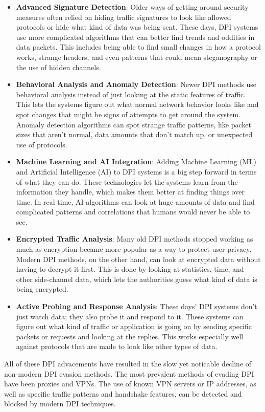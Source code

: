 \documentclass[12pt, fleqn, a4paper]{article}
\begin{document}
\begin{itemize}
  \item \textbf{Advanced Signature Detection}: Older ways of getting around security measures often relied on hiding traffic signatures to look like allowed protocols or hide what kind of data was being sent. These days, DPI systems use more complicated algorithms that can better find trends and oddities in data packets. This includes being able to find small changes in how a protocol works, strange headers, and even patterns that could mean steganography or the use of hidden channels.
  \item \textbf{Behavioral Analysis and Anomaly Detection}: Newer DPI methods use behavioral analysis instead of just looking at the static features of traffic. This lets the systems figure out what normal network behavior looks like and spot changes that might be signs of attempts to get around the system. Anomaly detection algorithms can spot strange traffic patterns, like packet sizes that aren't normal, data amounts that don't match up, or unexpected use of protocols.
  \item \textbf{Machine Learning and AI Integration}: Adding Machine Learning (ML) and Artificial Intelligence (AI) to DPI systems is a big step forward in terms of what they can do. These technologies let the systems learn from the information they handle, which makes them better at finding things over time. In real time, AI algorithms can look at huge amounts of data and find complicated patterns and correlations that humans would never be able to see. \citep{dpiml}
  \item \textbf{Encrypted Traffic Analysis}: Many old DPI methods stopped working as much as encryption became more popular as a way to protect user privacy. Modern DPI methods, on the other hand, can look at encrypted data without having to decrypt it first. This is done by looking at statistics, time, and other side-channel data, which lets the authorities guess what kind of data is being encrypted.
  \item \textbf{Active Probing and Response Analysis}: These days' DPI systems don't just watch data; they also probe it and respond to it. These systems can figure out what kind of traffic or application is going on by sending specific packets or requests and looking at the replies. This works especially well against protocols that are made to look like other types of data.\citep{dpiprobing}
\end{itemize}
All of these DPI advacements have resulted in the slow yet noticable decline of non-modern DPI evasion methods. The most prevalent methods of evading DPI have been proxies and VPNs. The use of known VPN servers or IP addresses, as well as specific traffic patterns and handshake features, can be detected and blocked by modern DPI techniques.
\end{document}
